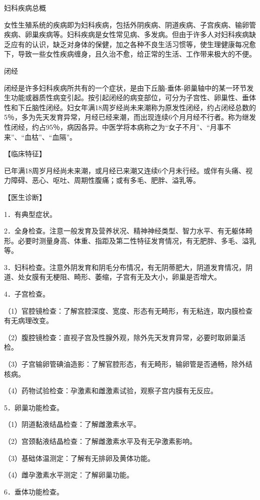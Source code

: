 \documentclass[12pt,UTF8]{ctexbook}
\begin{document}
妇科疾病总概


女性生殖系统的疾病即为妇科疾病，包括外阴疾病、阴道疾病、子宫疾病、输卵管疾病、卵巢疾病等。妇科疾病是女性常见病、多发病。但由于许多人对妇科疾病缺乏应有的认识，缺乏对身体的保健，加之各种不良生活习惯等，使生理健康每况愈下，导致一些女性疾病缠身，且久治不愈，给正常的生活、工作带来极大的不便。





闭经


闭经是许多妇科疾病所共有的一个症状，是由下丘脑-垂体-卵巢轴中的某一环节发生功能或器质性病变引起。按引起闭经的病变部位，可分为子宫性、卵巢性、垂体性和下丘脑性闭经。妇女年满18周岁经尚未来潮称为原发性闭经，约占闭经总数的5％，多为先天发育异常，月经已经来潮，而出现连续6个月月经不行者。称为继发性闭经，约占95％，病因各异。中医学将本病称之为“女子不月”、“月事不来”、“血枯”、“血隔”。

【临床特征】

已年满18周岁月经尚未来潮，或月经已来潮又连续6个月未行经。或伴有头痛、视力障碍、恶心、呕吐、周期性腹痛；或有多毛、肥胖、溢乳等。

【医生诊断】

1．有典型症状。

2．全身检查。注意一般发育及营养状况、精神神经类型、智力水平、有无躯体畸形。必要时测量身高、体重、指距及第二性特征发育情况，有无肥胖、多毛、溢乳等。

3．妇科检查。注意外阴发育和阴毛分布情况，有无阴蒂肥大，阴道发育情况，阴道、处女膜有无梗阻、畸形、萎缩，子宫有无及大小，卵巢是否增大。

4．子宫检查。

（1）官腔镜检查：了解宫腔深度、宽度、形态有无畸形，有无粘连，取内膜检查有无病理改变。

（2）腹腔镜检查：直视子宫及性腺外观，除外先天发育异常，必要时取卵巢活检。

（3）子宫输卵管碘油造影：了解官腔形态，有无畸形，输卵管是否通畅，除外结核病。

（4）药物试验检查：孕激素和雌激素试验，观察子宫内膜有无反应。

5．卵巢功能检查。

（1）阴道黏液结晶检查：了解雌激素水平。

（2）宫颈黏液结晶检查：了解雌激素水平及有无孕激素影响。

（3）基础体温测定：了解有无排卵及黄体功能。

（4）雌孕激素水平测定：了解卵巢功能。

6．垂体功能检查。
\end{document}
